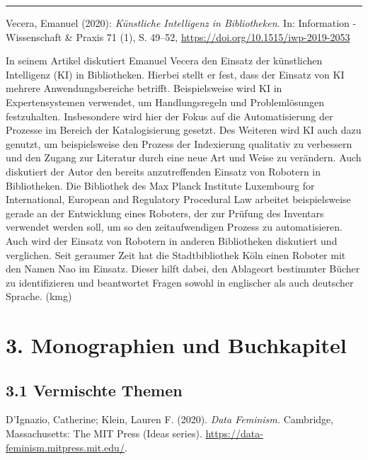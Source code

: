 \documentclass[a4paper,
fontsize=11pt,
oneside,
numbers=noperiodatend,
parskip=half-,
bibliography=totoc,
final
]{scrartcl}
\begin{document}
\begin{center}\rule{0.5\linewidth}{0.5pt}\end{center}

Vecera, Emanuel (2020): \emph{Künstliche Intelligenz in Bibliotheken}.
In: Information - Wissenschaft \& Praxis 71 (1), S. 49--52,
\url{https://doi.org/10.1515/iwp-2019-2053}

In seinem Artikel diskutiert Emanuel Vecera den Einsatz der künstlichen
Intelligenz (KI) in Bibliotheken. Hierbei stellt er fest, dass der
Einsatz von KI mehrere Anwendungsbereiche betrifft. Beispielsweise wird
KI in Expertensystemen verwendet, um Handlungsregeln und Problemlösungen
festzuhalten. Insbesondere wird hier der Fokus auf die Automatisierung
der Prozesse im Bereich der Katalogisierung gesetzt. Des Weiteren wird
KI auch dazu genutzt, um beispielsweise den Prozess der Indexierung
qualitativ zu verbessern und den Zugang zur Literatur durch eine neue
Art und Weise zu verändern. Auch diskutiert der Autor den bereits
anzutreffenden Einsatz von Robotern in Bibliotheken. Die Bibliothek des
Max Planck Institute Luxembourg for International, European and
Regulatory Procedural Law arbeitet beispielsweise gerade an der
Entwicklung eines Roboters, der zur Prüfung des Inventars verwendet
werden soll, um so den zeitaufwendigen Prozess zu automatisieren. Auch
wird der Einsatz von Robotern in anderen Bibliotheken diskutiert und
verglichen. Seit geraumer Zeit hat die Stadtbibliothek Köln einen
Roboter mit den Namen Nao im Einsatz. Dieser hilft dabei, den Ablageort
bestimmter Bücher zu identifizieren und beantwortet Fragen sowohl in
englischer als auch deutscher Sprache. (kmg)

\hypertarget{monographien-und-buchkapitel}{%
\section{3. Monographien und
Buchkapitel}\label{monographien-und-buchkapitel}}

\hypertarget{vermischte-themen-1}{%
\subsection{3.1 Vermischte Themen}\label{vermischte-themen-1}}

D'Ignazio, Catherine; Klein, Lauren F. (2020). \emph{Data Feminism.}
Cambridge, Massachusetts: The MIT Press (Ideas series).
\url{https://data-feminism.mitpress.mit.edu/}.
\end{document}
